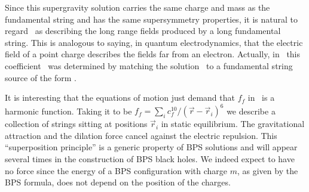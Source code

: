 Since this supergravity solution carries the same charge
and mass as the fundamental string and has the same
supersymmetry properties, it is natural to regard 
\fundstr \formofa \cf\ as describing the long range 
fields produced by a long fundamental string.
This is analogous to saying, in quantum electrodynamics,
 that the
electric field of a point charge describes the fields
far from an electron. 
Actually,
in \dh\ this coefficient \cf\ was determined by matching
the solution \fundstr\ to a fundamental string source
of the form \actionstr .


It is interesting that the equations of motion just demand
that $f_f$ in \fundstr\ is a harmonic function. Taking it
to be $ f_f = \sum_i c_f^{10}/(\vec r- \vec r_i)^6 $
 we describe a 
collection of strings sitting at positions $\vec r_i$ in
static equilibrium. The gravitational attraction and the 
dilation force cancel against the electric repulsion.
This ``superposition principle'' is a generic property 
of BPS solutions and will appear several times in
the construction of BPS black holes. 
We indeed expect to have no force since the energy of a 
BPS configuration with charge $m$, as given by the
BPS formula, does not depend on the position of the
charges. 



